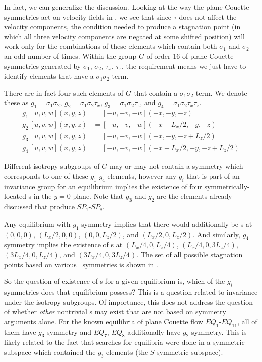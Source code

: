 \documentclass[letter,12pt,openany]{article}
\begin{document}
In fact, we can generalize the discussion.
Looking at the way the plane Couette symmetries act on velocity
fields in ,
we see that since $\tau$ does not affect the velocity components,
the condition needed to produce a stagnation point (in which all three velocity components are negated at some shifted position) will work only for the combinations of these
elements which contain both $\sigma_{1}$ and $\sigma_{2}$ an odd
number of times. Within the group $G$ of order 16 of plane Couette
symmetries generated by $\sigma_{1}$, $\sigma_{2}$, $\tau_{x}$,
$\tau_{z}$, the requirement means we just have to identify elements that have a $\sigma_{1}\sigma_{2}$ term. 

There are in fact four such elements of $G$ that contain a
$\sigma_{1}\sigma_{2}$ term. We denote these as $g_1 = \sigma_{1}\sigma_{2}$,
$g_2 = \sigma_{1}\sigma_{2}\tau_{x}$, $g_3 =
\sigma_{1}\sigma_{2}\tau_{z}$, and $g_4 = \sigma_{1}\sigma_{2}\tau_x
\tau_z$. 
\begin{align}
g_1 \, [u,v,w](x,y,z) &= [-u,-v,-w](-x,-y,-z)  \\
g_2 \, [u,v,w](x,y,z) &= [-u,-v,-w](-x+L_{x}/2,-y,-z)  \\
g_3 \, [u,v,w](x,y,z) &= [-u,-v,-w](-x,-y,-z+L_{z}/2)  \\
g_4 \, [u,v,w](x,y,z) &= [-u,-v,-w](-x+L_{x}/2,-y,-z+L_{z}/2)
\end{align}


Different isotropy subgroups of $G$ may or may not contain a symmetry which corresponds to one of these $g_1$-$g_4$ elements, however any $g_i$ that is part of an invariance group for an equilibrium implies the existence of four symmetrically-located \stagp s in the
$y = 0$ plane. Note that $g_3$ and $g_2$ are the elements
already  discussed that produce $SP_1$-$SP_8$.

 Any equilibrium with $g_1$ symmetry implies that there would additionally be \stagp s at $(0,0,0)$, $(L_{x}/2,0,0)$, $(0,0,L_{z}/2)$, and
$(L_{x}/2,0,L_{z}/2)$. And similarly, $g_4$ symmetry implies the existence of
\stagp s at $(L_{x}/4,0,L_{z}/4)$, $(L_{x}/4,0,3L_{z}/4)$,
$(3L_{x}/4,0,L_{z}/4)$, and $(3L_{x}/4,0,3L_{z}/4)$. The set of all possible stagnation points based on various \pCf\ symmetries
 is shown in .

So the question of existence of \stagp s for a given equilibrium is, which of the
$g_i$ symmetries does that equilibrium possess? This is a question related to
invariance under the isotropy subgroups. Of importance, this does not
address the question of whether \textit{other} nontrivial \stagp s may exist that are not based on symmetry arguments alone. For the known equilibria of plane Couette flow $EQ_1$-$EQ_{11}$, all of
them have $g_3$ symmetry and $EQ_7$, $EQ_8$ additionally have $g_2$ symmetry. This is likely related to the fact that searches for
equilibria were done in a symmetric subspace which contained the
$g_3$ elements (the $S$-symmetric subspace). \\
\end{document}
